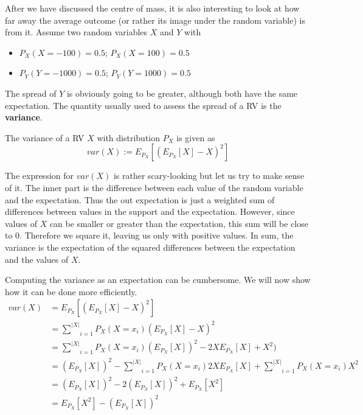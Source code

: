 \documentclass[a4paper,11pt,leqno]{report}
\begin{document}
After we have discussed the centre of mass, it is also interesting to look at how far away the average outcome (or rather its image
under the random variable) is from it. Assume two random variables $ X $ and $ Y $ with
\begin{itemize}
\item $ P_{X}(X=-100) = 0.5 $; $ P_{X}(X=100) = 0.5 $
\item $ P_{Y}(Y=-1000) = 0.5 $; $ P_{Y}(Y=1000) = 0.5 $
\end{itemize}
The spread of $ Y $ is obviously going to be greater, although both have the same expectation. The quantity usually used to assess
the spread of a RV is the \textbf{variance}.

\begin{Definition}
The variance of a RV $ X $ with distribution $ P_{X} $ is given as
$$ var(X) := E_{P_{X}}[(E_{P_{X}}[X] - X)^{2}] $$
\end{Definition}

The expression for $ var(X) $ is rather scary-looking but let us try to make sense of it. The inner part is the difference between
each value of the random variable and the expectation. Thus the out expectation is just a weighted sum of differences between 
values in the support and the expectation. However, since values of $ X $ can be smaller or greater than the expectation, this
sum will be close to 0. Therefore we square it, leaving us only with positive values. In sum, the variance is the expectation
of the squared differences between the expectation and the values of $ X $.

Computing the variance as an expectation can be cumbersome. We will now show how it can be done more efficiently.
\begin{align}
var(X) &= E_{P_{X}}[(E_{P_{X}}[X] - X)^{2}] \\
&= \underset{i = 1}{\overset{|X|}{\sum}} P_{X}(X=x_{i}) (E_{P_{X}}[X] - X)^{2} \\
&= \underset{i = 1}{\overset{|X|}{\sum}} P_{X}(X=x_{i}) (E_{P_{X}}[X])^{2} - 2XE_{P_{X}}[X] + X^{2}) \\
&= (E_{P_{X}}[X])^{2} - \underset{i = 1}{\overset{|X|}{\sum}} P_{X}(X=x_{i}) 2XE_{P_{X}}[X]
+  \underset{i = 1}{\overset{|X|}{\sum}} P_{X}(X=x_{i})  X^{2} \\
&= (E_{P_{X}}[X])^{2} -  2(E_{P_{X}}[X])^{2} +  E_{P_{X}}[X^{2}] \\
&= E_{P_{X}}[X^{2}] - (E_{P_{X}}[X])^{2} \label{variance}
\end{align}
\end{document}
